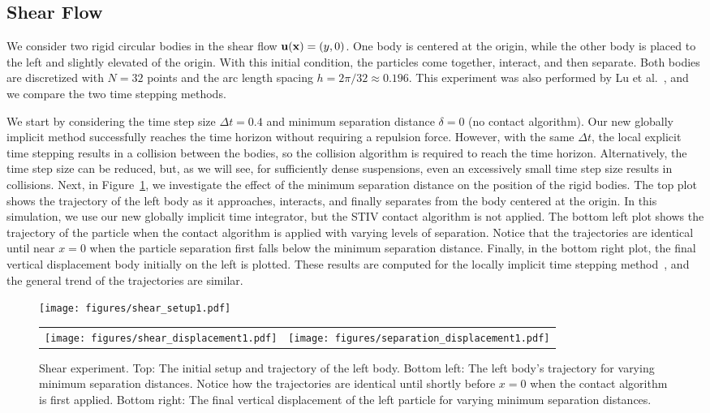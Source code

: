 \documentclass[preprint, 10pt]{elsarticle}
\begin{document}
\subsection{Shear Flow}
\label{sec:shear}
We consider two rigid circular bodies in the shear flow ${{\mathbf{u}}}({\mathbf{x}}) =
(y,0)$.  One body is centered at the origin, while the other body is
placed to the left and slightly elevated of the origin.  With this
initial condition, the particles come together, interact, and then
separate.  Both bodies are discretized with $N=32$ points and the arc
length spacing $h = 2\pi/32 \approx 0.196$.  This experiment was also
performed by Lu et al.~\cite{Lu2017}, and we compare the two time
stepping methods.

We start by considering the time step size $\Delta t = 0.4$ and
minimum separation distance $\delta = 0$ (no contact algorithm). 
Our new globally implicit method successfully reaches the time
horizon without requiring a repulsion force.  However, with the same
$\Delta t$, the local explicit time stepping results in a collision
between the bodies, so the collision algorithm is required to reach the
time horizon.  Alternatively, the time step size can be reduced, but, as
we will see, for sufficiently dense suspensions, even an excessively
small time step size results in collisions.  Next, in
Figure~\ref{fig:shear_experiment}, we investigate the effect of the
minimum separation distance on the position of the rigid bodies.  The
top plot shows the trajectory of the left body as it approaches,
interacts, and finally separates from the body centered at the origin.
In this simulation, we use our new globally implicit time integrator,
but the STIV contact algorithm is not applied.  The bottom left plot
shows the trajectory of the particle when the contact algorithm is
applied with varying levels of separation.  Notice that the trajectories
are identical until near $x=0$ when the particle separation first falls
below the minimum separation distance.  Finally, in the bottom right
plot, the final vertical displacement body initially on the left is
plotted.  These results are computed for the locally implicit time
stepping method~\cite{Lu2017}, and the general trend of the trajectories
are similar.
\begin{figure}[!h]
  \begin{center}
    \texttt{[image: figures/shear\_setup1.pdf]}
    \begin{tabular}{c c}
      \texttt{[image: figures/shear\_displacement1.pdf]} &
      \texttt{[image: figures/separation\_displacement1.pdf]}
    \end{tabular}
  \end{center}
\caption{\label{fig:shear_experiment} Shear experiment. Top: The initial
setup and trajectory of the left body.   Bottom left: The left body's
trajectory for varying minimum separation distances.  Notice how
the trajectories are identical until shortly before $x=0$ when the
contact algorithm is first applied.  Bottom right: The final vertical
displacement of the left particle for varying minimum separation
distances.}
\end{figure}
\end{document}
